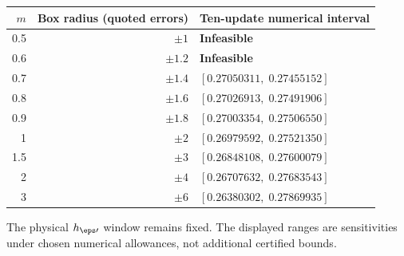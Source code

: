 \begin{center}
\begin{tabular}{@{}rrl@{}}\toprule
$m$ & Box radius (quoted errors) & Ten-update numerical interval\\\midrule
0.5 & $\pm1$ & \textbf{Infeasible} \\
0.6 & $\pm1.2$ & \textbf{Infeasible} \\
0.7 & $\pm1.4$ & $[0.27050311,\;0.27455152]$ \\
0.8 & $\pm1.6$ & $[0.27026913,\;0.27491906]$ \\
0.9 & $\pm1.8$ & $[0.27003354,\;0.27506550]$ \\
1 & $\pm2$ & $[0.26979592,\;0.27521350]$ \\
1.5 & $\pm3$ & $[0.26848108,\;0.27600079]$ \\
2 & $\pm4$ & $[0.26707632,\;0.27683543]$ \\
3 & $\pm6$ & $[0.26380302,\;0.27869935]$ \\
\bottomrule
\end{tabular}
\end{center}
The physical $h_{\eps\prime}$ window remains fixed. The displayed ranges are sensitivities under chosen numerical allowances, not additional certified bounds.

